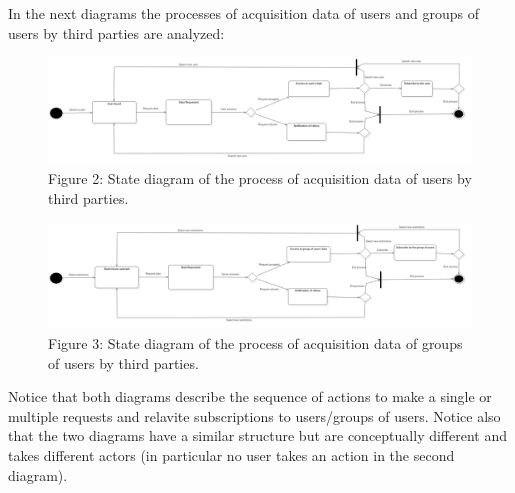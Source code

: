 \vspace{0.5cm}In the next diagrams the processes of acquisition data of users and groups of users by third parties are analyzed:
\begin{figure}[!h]
	\includegraphics[width=1.00\textwidth]{./pictures/State_diagram_users_v_1.jpg}\par
	\caption{Figure 2: State diagram of the process of acquisition data of users by third parties.}
\end{figure}
\FloatBarrier
\vspace{0.3cm}

\begin{figure}[!h]
	\includegraphics[width=1.00\textwidth]{./pictures/State_diagram_groups_v_1.jpg}\par
	\caption{Figure 3: State diagram of the process of acquisition data of groups of users by third parties.} 
\end{figure}
\FloatBarrier
\vspace{0.3cm}Notice that both diagrams describe the sequence of actions to make a single or multiple requests and relavite subscriptions to users/groups of users. Notice also that the two diagrams have a similar structure but are conceptually different and takes different actors (in particular no user takes an action in the second diagram).